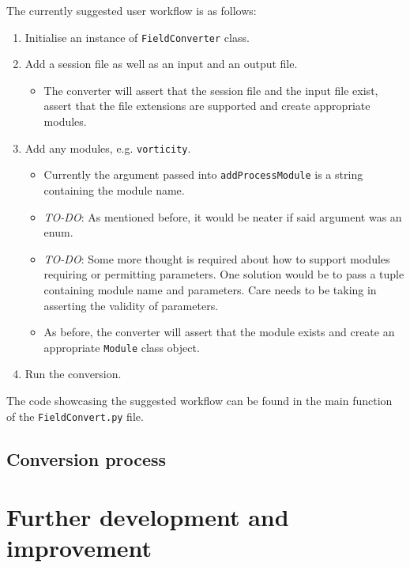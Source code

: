 The currently suggested user workflow is as follows:

\begin{enumerate}
	\item Initialise an instance of \texttt{FieldConverter} class.
	\item Add a session file as well as an input and an output file.
	\begin{itemize}
		\item The converter will assert that the session file and the input file 
		exist, assert that the file extensions are supported and create appropriate 
		modules.
	\end{itemize}
	\item Add any modules, e.g. \texttt{vorticity}.
	\begin{itemize}
		\item Currently the argument passed into \texttt{addProcessModule} is a 
		string containing the module name.
		\item \emph{TO-DO}: As mentioned before, it would be neater if said 
		argument was an enum.
		\item \emph{TO-DO}: Some more thought is required about how to support 
		modules requiring or permitting parameters. One solution would be to pass 
		a tuple containing module name and parameters. Care needs to be taking in 
		asserting the validity of parameters.
		\item As before, the converter will assert that the module exists and create 
		an appropriate \texttt{Module} class object.
	\end{itemize}
	\item Run the conversion.
\end{enumerate}

The code showcasing the suggested workflow can be found in the main function of the 
\texttt{FieldConvert.py} file.

\subsection{Conversion process}

\section{Further development and improvement}
